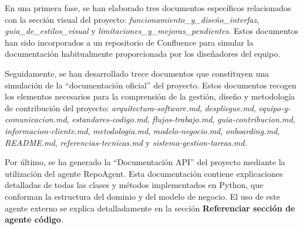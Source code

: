 En una primera fase, se han elaborado tres documentos específicos relacionados con la sección visual del proyecto: \textit{funcionamiento\_y\_diseño\_interfaz}, \textit{guia\_de\_estilos\_visual} y \textit{limitaciones\_y\_mejoras\_pendientes}. Estos documentos han sido incorporados a un repositorio de Confluence para simular la documentación habitualmente proporcionada por los diseñadores del equipo.

Seguidamente, se han desarrollado trece documentos que constituyen una simulación de la ``documentación oficial'' del proyecto. Estos documentos recogen los elementos necesarios para la comprensión de la gestión, diseño y metodología de contribución del proyecto: \textit{arquitectura-software.md}, \textit{despliegue.md}, \textit{equipo-y-comunicacion.md}, \textit{estandares-codigo.md}, \textit{flujos-trabajo.md}, \textit{guia-contribucion.md}, \textit{informacion-cliente.md}, \textit{metodologia.md}, \textit{modelo-negocio.md}, \textit{onboarding.md}, \textit{README.md}, \textit{referencias-tecnicas.md} y \textit{sistema-gestion-tareas.md}.

Por último, se ha generado la ``Documentación API'' del proyecto mediante la utilización del agente RepoAgent\cite{luo_repoagent_2024}. Esta documentación contiene explicaciones detalladas de todas las clases y métodos implementados en Python, que conforman la estructura  del dominio y del modelo de negocio. El uso de este agente externo se explica detalladamente en la sección \textbf{Referenciar sección de agente código}.












